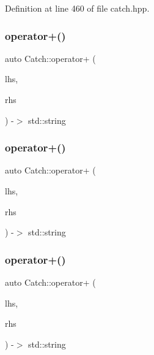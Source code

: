 Definition at line 460 of file catch.\+hpp.

\mbox{\label{namespace_catch_a3a766cb0b8c792c9151baaaf1e8003eb}} 
\subsubsection{operator+()\hspace{0.1cm}{\footnotesize\ttfamily [2/4]}}
{\footnotesize\ttfamily auto Catch\+::operator+ (\begin{DoxyParamCaption}\item[{\textbf{ String\+Ref} const \&}]{lhs,  }\item[{\textbf{ String\+Ref} const \&}]{rhs }\end{DoxyParamCaption}) -\/$>$  std\+::string}

\mbox{\label{namespace_catch_ab7bdb68d0e4329df79e293f9207b55e9}} 
\subsubsection{operator+()\hspace{0.1cm}{\footnotesize\ttfamily [3/4]}}
{\footnotesize\ttfamily auto Catch\+::operator+ (\begin{DoxyParamCaption}\item[{\textbf{ String\+Ref} const \&}]{lhs,  }\item[{char const $\ast$}]{rhs }\end{DoxyParamCaption}) -\/$>$  std\+::string}

\mbox{\label{namespace_catch_a764a678121fa11c590a53618baa47680}} 
\subsubsection{operator+()\hspace{0.1cm}{\footnotesize\ttfamily [4/4]}}
{\footnotesize\ttfamily auto Catch\+::operator+ (\begin{DoxyParamCaption}\item[{char const $\ast$}]{lhs,  }\item[{\textbf{ String\+Ref} const \&}]{rhs }\end{DoxyParamCaption}) -\/$>$  std\+::string}

\mbox{\label{namespace_catch_a61711bc909f8dc76d8b3deccc1440f46}} 
